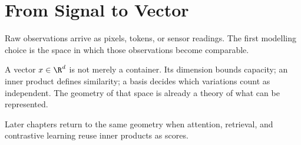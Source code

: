 \chapter{From Signal to Vector}
\label{ch:signal-to-vector}

Raw observations arrive as pixels, tokens, or sensor readings. The first modelling choice is the space in which those observations become comparable.

A vector $x \in \R^d$ is not merely a container. Its dimension bounds capacity; an inner product defines similarity; a basis decides which variations count as independent. The geometry of that space is already a theory of what can be represented.

\begin{center}

\end{center}

\begin{remark}
Later chapters return to the same geometry when attention, retrieval, and contrastive learning reuse inner products as scores.
\end{remark}
